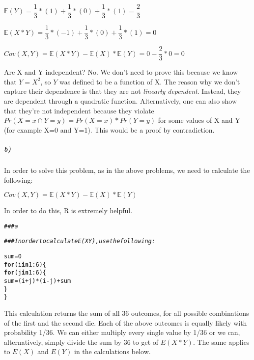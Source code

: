 \documentclass[12pt,letter]{article}\usepackage[]{graphicx}\usepackage[]{color}
\makeatletter
\newcommand{\hlnum}[1]{\textcolor[rgb]{0.686,0.059,0.569}{#1}}%
\newcommand{\hlcom}[1]{\textcolor[rgb]{0.678,0.584,0.686}{\textit{#1}}}%
\newcommand{\hlopt}[1]{\textcolor[rgb]{0,0,0}{#1}}%
\newcommand{\hlstd}[1]{\textcolor[rgb]{0.345,0.345,0.345}{#1}}%
\newcommand{\hlkwa}[1]{\textcolor[rgb]{0.161,0.373,0.58}{\textbf{#1}}}%
\newcommand{\hlkwb}[1]{\textcolor[rgb]{0.69,0.353,0.396}{#1}}%
\newenvironment{kframe}{%
 \def\at@end@of@kframe{}%
 \ifinner\ifhmode%
  \def\at@end@of@kframe{\end{minipage}}%
  \begin{minipage}{\columnwidth}%
 \fi\fi%
 \def\FrameCommand##1{\hskip\@totalleftmargin \hskip-\fboxsep
 \colorbox{shadecolor}{##1}\hskip-\fboxsep
     \hskip-\linewidth \hskip-\@totalleftmargin \hskip\columnwidth}%
 \MakeFramed {\advance\hsize-\width
   \@totalleftmargin\z@ \linewidth\hsize
   \@setminipage}}%
 {\par\unskip\endMakeFramed%
 \at@end@of@kframe}
\newenvironment{knitrout}{}{} %
\makeatother
\begin{document}
$\mathbb{E}(Y) = \dfrac{1}{3}*(1) + \dfrac{1}{3}*(0) + \dfrac{1}{3}*(1) = \dfrac{2}{3}$

$\mathbb{E}(X*Y) = \dfrac{1}{3}*(-1) + \dfrac{1}{3}*(0) + \dfrac{1}{3}*(1) = 0$

$Cov (X, Y) = \mathbb{E}(X*Y) - \mathbb{E}(X)*\mathbb{E}(Y) = 0 - \dfrac{2}{3} * 0 = 0$

Are X and Y independent? No. We don't need to prove this because we know that $Y=X^2$, so $Y$ was defined to be a function of X. The reason why we don't capture their dependence is that they are not \textit{linearly dependent}. Instead, they are dependent through a quadratic function. Alternatively, one can also show that they're not independent because they violate $Pr (X=x \cap Y=y) = Pr(X=x)*Pr(Y=y)$ for some values of X and Y (for example X=0 and Y=1). This would be a proof by contradiction.

\subparagraph{b)} In order to solve this problem, as in the above problems, we need to calculate the following:

$Cov(X, Y) = \mathbb{E}(X*Y)-\mathbb{E}(X)*\mathbb{E}(Y)$

In order to do this, R is extremely helpful.

\begin{knitrout}
\color{fgcolor}\begin{kframe}
\begin{alltt}
\hlcom{### a}

\hlcom{### In order to calculate E(XY), use the following:}

\hlstd{sum} \hlkwb{=} \hlnum{0}
\hlkwa{for} \hlstd{(i} \hlkwa{in} \hlnum{1}\hlopt{:}\hlnum{6}\hlstd{) \{}
    \hlkwa{for} \hlstd{(j} \hlkwa{in} \hlnum{1}\hlopt{:}\hlnum{6}\hlstd{) \{}
        \hlstd{sum} \hlkwb{=} \hlstd{(i} \hlopt{+} \hlstd{j)} \hlopt{*} \hlstd{(i} \hlopt{-} \hlstd{j)} \hlopt{+} \hlstd{sum}
    \hlstd{\}}
\hlstd{\}}
\end{alltt}
\end{kframe}
\end{knitrout}

This calculation returns the sum of all 36 outcomes, for all possible combinations of the first and the second die. Each of the above outcomes is equally likely with probability 1/36. We can either multiply every single value by 1/36 or we can, alternatively, simply divide the sum by 36 to get of $E(X*Y)$. The same applies to $E(X)$ and $E(Y)$ in the calculations below.
\end{document}
